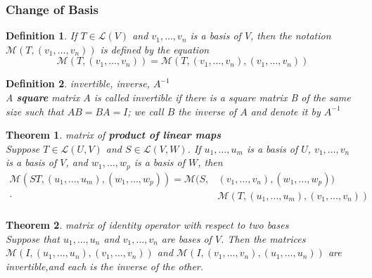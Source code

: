 \documentclass{article}
\newtheorem{theorem}{Theorem}[subsection]
\newtheorem{definition}{Definition}[subsection]
\begin{document}
\begin{CJK}{UTF8}{gkai}
\subsubsection{Change of Basis}

\begin{definition}
    If $T \in \mathcal{L}(V)$ and $v_1,\ldots,v_n$ is a basis of $V$, then the notation $\mathcal{M}(T,(v_1,\ldots,v_n))$ is defined by the equation
    \[\mathcal{M}(T,(v_1,\ldots,v_n)) = \mathcal{M}(T,(v_1,\ldots,v_n),(v_1,\ldots,v_n))\]
    
\end{definition}

\begin{definition}
    invertible, inverse, $A^{-1}$\\

    A \textbf{square} matrix $A$ is called invertible if there is a square matrix B of the same size such that $AB = BA = I$; we call $B$ the inverse of $A$ and denote it by $A^{-1}$\\
\end{definition}

\begin{theorem}
    matrix of \textbf{product of linear maps}\\

    Suppose $T \in \mathcal{L}(U,V)$ and $S \in \mathcal{L}(V,W)$. If $u_1,\ldots,u_m$ is a basis of $U$, $v_1,\ldots,v_n$ is a basis of $V$, and $w_1,\ldots,w_p$ is a basis of $W$, then 
    \[\begin{aligned}
        \mathcal{M}(ST,(u_1,\ldots,u_m) , (w_1,\ldots,w_p)) =    \mathcal{M}(S , &(v_1,\ldots,v_n) , (w_1,\ldots,w_p))\\
        \cdot&\mathcal{M}(T,(u_1,\ldots,u_m) , (v_1,\ldots,v_n))\\
    \end{aligned}
        \]

\end{theorem}

\begin{theorem}
    matrix of identity operator with respect to two bases\\

    Suppose that $u_1,\ldots,u_n$ and $v_1,\ldots,v_n$ are bases of $V$. Then the matrices $\mathcal{M}(I,(u_1,\ldots,u_n),(v_1,\ldots,v_n))$ and $\mathcal{M}(I,(v_1,\ldots,v_n),(u_1,\ldots,u_n))$ are invertible,and each is the inverse of the other.\\
\end{theorem}


\end{CJK}
\end{document}
